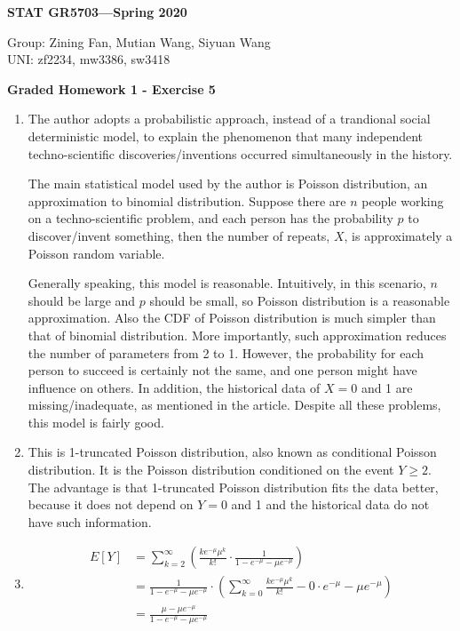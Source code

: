 \documentclass[11pt]{article}
\begin{document}
\begin{flushright}
{\bf STAT GR5703---Spring 2020}
\end{flushright}
\begin{flushleft}
Group: Zining Fan, Mutian Wang, Siyuan Wang\\
UNI: zf2234, mw3386, sw3418\\
\end{flushleft}

\bigskip
\centerline{\bf Graded Homework 1 - Exercise 5}

\bigskip
\begin{enumerate}
\item The author adopts a probabilistic approach, instead of a trandional social deterministic model, to explain the phenomenon that many independent techno-scientific discoveries/inventions occurred simultaneously in the history. \par
The main statistical model used by the author is Poisson distribution, an approximation to binomial distribution. Suppose there are $n$ people working on a techno-scientific problem, and each person has the probability $p$ to discover/invent something, then the number of repeats, $X$, is approximately a Poisson random variable. \par
Generally speaking, this model is reasonable. Intuitively, in this scenario, $n$ should be large and $p$ should be small, so Poisson distribution is a reasonable approximation. Also the CDF of Poisson distribution is much simpler than that of binomial distribution. More importantly, such approximation reduces the number of parameters from 2 to 1. However, the probability for each person to succeed is certainly not the same, and one person might have influence on others. In addition, the historical data of $X=0$ and 1 are missing/inadequate, as mentioned in the article. Despite all these problems, this model is fairly good.

\item This is 1-truncated Poisson distribution, also known as conditional Poisson distribution. It is the Poisson distribution conditioned on the event $Y \ge 2$. The advantage is that 1-truncated Poisson distribution fits the data better, because it does not depend on $Y=0$ and 1 and the historical data do not have such information.

\item
\begin{equation*}
\begin{split}
E[Y] &= \sum\limits_{k=2}^{\infty} \left( 
\frac{ke^{-\mu}\mu^k}{k!} \cdot \frac{1}{1-e^{-\mu}-\mu e^{-\mu}} \right) \\
&= \frac{1}{1-e^{-\mu}-\mu e^{-\mu}} \cdot \left(
 \sum\limits_{k=0}^{\infty} \frac{ke^{-\mu}\mu^k}{k!} - 0\cdot e^{-\mu}-\mu e^{-\mu} \right) \\
&= \frac{\mu-\mu e^{-\mu}}{1-e^{-\mu}-\mu e^{-\mu}}
\end{split}
\end{equation*}


\end{enumerate}
\end{document}
